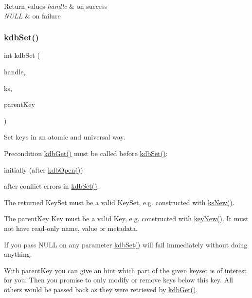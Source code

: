 \begin{DoxyRetVals}{Return values}
{\em handle} & on success \\
\hline
{\em N\+U\+LL} & on failure \\
\hline
\end{DoxyRetVals}
\mbox{\label{group__kdb_ga11436b058408f83d303ca5e996832bcf}} 
\subsubsection{\texorpdfstring{kdb\+Set()}{kdbSet()}}
{\footnotesize\ttfamily int kdb\+Set (\begin{DoxyParamCaption}\item[{K\+DB $\ast$}]{handle,  }\item[{Key\+Set $\ast$}]{ks,  }\item[{Key $\ast$}]{parent\+Key }\end{DoxyParamCaption})}



Set keys in an atomic and universal way. 

\begin{DoxyPrecond}{Precondition}
\hyperlink{group__kdb_ga28e385fd9cb7ccfe0b2f1ed2f62453a1}{kdb\+Get()} must be called before \hyperlink{group__kdb_ga11436b058408f83d303ca5e996832bcf}{kdb\+Set()}\+:
\begin{DoxyItemize}
\item initially (after \hyperlink{group__kdb_ga844e1299a84c3fbf1d3a905c5c893ba5}{kdb\+Open()})
\item after conflict errors in \hyperlink{group__kdb_ga11436b058408f83d303ca5e996832bcf}{kdb\+Set()}.
\end{DoxyItemize}

The {\ttfamily returned} Key\+Set must be a valid Key\+Set, e.\+g. constructed with \hyperlink{group__keyset_ga671e1aaee3ae9dc13b4834a4ddbd2c3c}{ks\+New()}.

The {\ttfamily parent\+Key} Key must be a valid Key, e.\+g. constructed with \hyperlink{group__key_gad23c65b44bf48d773759e1f9a4d43b89}{key\+New()}. It must not have read-\/only name, value or metadata.
\end{DoxyPrecond}
If you pass N\+U\+LL on any parameter \hyperlink{group__kdb_ga11436b058408f83d303ca5e996832bcf}{kdb\+Set()} will fail immediately without doing anything.

With {\ttfamily parent\+Key} you can give an hint which part of the given keyset is of interest for you. Then you promise to only modify or remove keys below this key. All others would be passed back as they were retrieved by \hyperlink{group__kdb_ga28e385fd9cb7ccfe0b2f1ed2f62453a1}{kdb\+Get()}.


